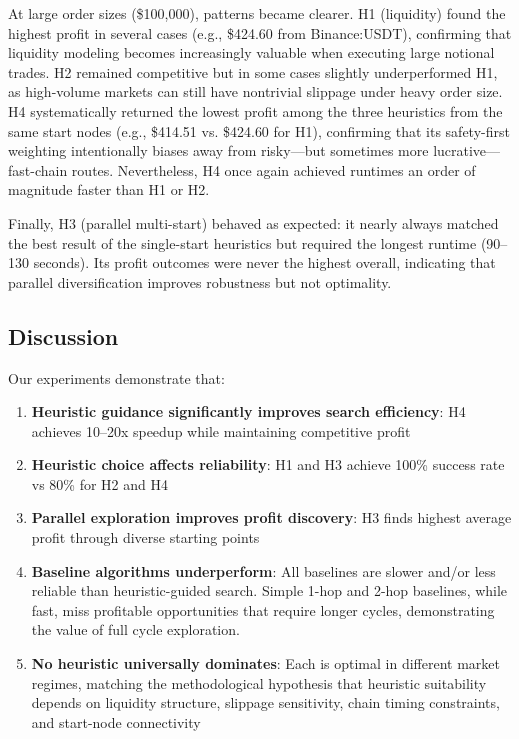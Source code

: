 \documentclass[11pt]{article}
\begin{document}
At large order sizes (\$100,000), patterns became clearer. H1 (liquidity) found the highest profit in several cases (e.g., \$424.60 from Binance:USDT), confirming that liquidity modeling becomes increasingly valuable when executing large notional trades. H2 remained competitive but in some cases slightly underperformed H1, as high-volume markets can still have nontrivial slippage under heavy order size. H4 systematically returned the lowest profit among the three heuristics from the same start nodes (e.g., \$414.51 vs. \$424.60 for H1), confirming that its safety-first weighting intentionally biases away from risky---but sometimes more lucrative---fast-chain routes. Nevertheless, H4 once again achieved runtimes an order of magnitude faster than H1 or H2.

Finally, H3 (parallel multi-start) behaved as expected: it nearly always matched the best result of the single-start heuristics but required the longest runtime (90--130 seconds). Its profit outcomes were never the highest overall, indicating that parallel diversification improves robustness but not optimality.

\subsection{Discussion}

Our experiments demonstrate that:

\begin{enumerate}
\item \textbf{Heuristic guidance significantly improves search efficiency}: H4 achieves 10--20x speedup while maintaining competitive profit
\item \textbf{Heuristic choice affects reliability}: H1 and H3 achieve 100\% success rate vs 80\% for H2 and H4
\item \textbf{Parallel exploration improves profit discovery}: H3 finds highest average profit through diverse starting points
\item \textbf{Baseline algorithms underperform}: All baselines are slower and/or less reliable than heuristic-guided search. Simple 1-hop and 2-hop baselines, while fast, miss profitable opportunities that require longer cycles, demonstrating the value of full cycle exploration.
\item \textbf{No heuristic universally dominates}: Each is optimal in different market regimes, matching the methodological hypothesis that heuristic suitability depends on liquidity structure, slippage sensitivity, chain timing constraints, and start-node connectivity
\end{enumerate}
\end{document}

